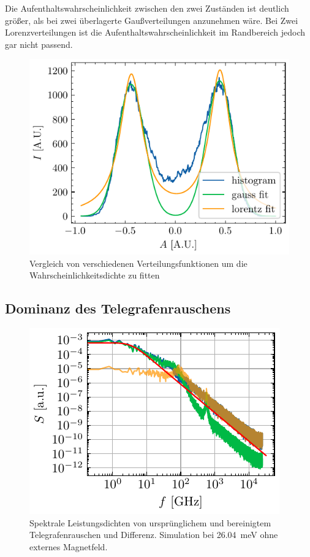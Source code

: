 \documentclass[main.tex]{subfiles}
\begin{document}
Die Aufenthaltswahrscheinlichkeit zwischen den zwei Zuständen ist deutlich größer, als bei zwei überlagerte Gaußverteilungen anzunehmen wäre. Bei Zwei Lorenzverteilungen ist die Aufenthaltswahrscheinlichkeit im Randbereich jedoch gar nicht passend.

\begin{figure}[H]
    \centering
    \includegraphics{bilder/plots/theo-vis/hist_fit_comp.pdf}
    \caption{Vergleich von verschiedenen Verteilungsfunktionen um die Wahrscheinlichkeitsdichte zu fitten}\label{fig:fit_comp}
\end{figure}

\subsection{Dominanz des Telegrafenrauschens}

\begin{figure}[H]
    \centering
    \includegraphics{bilder/plots/Bz_0mT/spectral_power_densities_26.03meV.pdf}
    \caption{Spektrale Leistungsdichten von ursprünglichem und bereinigtem Telegrafenrauschen und Differenz. Simulation bei \SI{26.04}{\milli\electronvolt} ohne externes Magnetfeld.}\label{fig:spds}
\end{figure}
\end{document}
